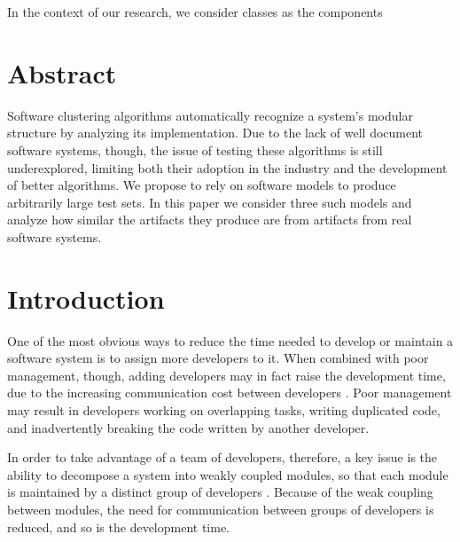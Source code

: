 \newcommand{\din}[0]{\ensuremath{\delta_{in}}}
\newcommand{\dout}[0]{\ensuremath{\delta_{out}}}

In the context of our research, we consider classes as the components

\section{Abstract}

Software clustering algorithms automatically recognize a system's
modular structure by analyzing its implementation.
Due to the lack of well document software systems, though, the issue of testing
these algorithms is still underexplored, limiting both their adoption in the
industry and the development of better algorithms.
We propose to rely on software models to produce arbitrarily large test sets. In
this paper we consider three such models and analyze how similar the artifacts
they produce are from artifacts from real software systems.

\section{Introduction}

%

One of the most obvious ways to reduce the time needed to develop or maintain a
software system is to assign more developers to it. When combined with poor
management, though, adding developers may in fact raise the development time,
due to the increasing communication cost between developers \cite{Brooks1995}.
Poor management may result in developers working on overlapping tasks, writing
duplicated code, and inadvertently breaking the code written by another
developer.


In order to take advantage of a team of developers, therefore, a key issue is
the ability to decompose a system into weakly coupled modules, so that each
module is maintained by a distinct group of developers \cite{Parnas1972}.
Because of the weak coupling between modules, the need for communication between
groups of developers is reduced, and so is the development time.
 
